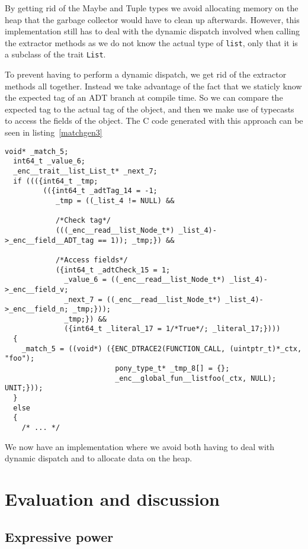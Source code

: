 \documentclass[10pt]{report}
\def\code#1{\texttt{#1}} %
\begin{document}
{\begin{lstlisting}[language=encore,caption={Pattern matching on a List},label=matchgen2]
\end{lstlisting}
\par{By getting rid of the Maybe and Tuple types we avoid allocating memory on the heap that the garbage collector would have to clean up afterwards. However, this implementation still has to deal with the dynamic dispatch involved when calling the extractor methods as we do not know the actual type of \code{list}, only that it is a subclass of the trait \code{List}.}

\par{To prevent having to perform a dynamic dispatch, we get rid of the extractor methods all together. Instead we take advantage of the fact that we staticly know the expected tag of an ADT branch at compile time. So we can compare the expected tag to the actual tag of the object, and then we make use of typecasts to access the fields of the object. The C code generated with this approach can be seen in listing~\ref{matchgen3}}

\begin{lstlisting}[language=encore,caption={Pattern matching on a List},label=matchgen3]
  void* _match_5;
  int64_t _value_6;
  _enc__trait__list_List_t* _next_7;
  if ((({int64_t _tmp;
         (({int64_t _adtTag_14 = -1;
            _tmp = ((_list_4 != NULL) &&

            /*Check tag*/
            (((_enc__read__list_Node_t*) _list_4)->_enc__field__ADT_tag == 1)); _tmp;}) &&

            /*Access fields*/
            ({int64_t _adtCheck_15 = 1;
              _value_6 = ((_enc__read__list_Node_t*) _list_4)->_enc__field_v;
              _next_7 = ((_enc__read__list_Node_t*) _list_4)->_enc__field_n; _tmp;}));
              _tmp;}) &&
              ({int64_t _literal_17 = 1/*True*/; _literal_17;})))
  {
    _match_5 = ((void*) ({ENC_DTRACE2(FUNCTION_CALL, (uintptr_t)*_ctx, "foo");
                          pony_type_t* _tmp_8[] = {};
                          _enc__global_fun__listfoo(_ctx, NULL); UNIT;}));
  }
  else
  {
    /* ... */

\end{lstlisting}
\par{We now have an implementation where we avoid both having to deal with dynamic dispatch and to allocate data on the heap.}
\chapter{Evaluation and discussion}
\section{Expressive power}
}
\end{document}
